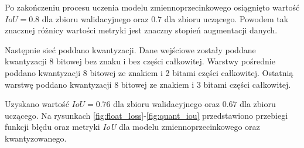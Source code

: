 Po zakończeniu procesu uczenia modelu zmiennoprzecinkowego osiągnięto wartość $IoU = 0.8$ dla zbioru walidacyjnego oraz $0.7$ dla zbioru uczącego. 
Powodem tak znacznej różnicy wartości metryki jest znaczny stopień augmentacji danych.

Następnie sieć poddano kwantyzacji. 
Dane wejściowe zostały poddane kwantyzacji 8 bitowej bez znaku i bez części całkowitej.
Warstwy pośrednie poddano kwantyzacji 8 bitowej ze znakiem i 2 bitami części całkowitej.
Ostatnią warstwę poddano kwantyzacji 8 bitowej ze znakiem i 3 bitami części całkowitej.

Uzyskano wartość $IoU = 0.76$ dla zbioru walidacyjnego oraz $0.67$ dla zbioru uczącego.
Na rysunkach \ref{fig:float_loss}-\ref{fig:quant_iou} przedstawiono przebiegi funkcji błędu oraz metryki \emph{IoU} dla modelu zmiennoprzecinkowego oraz kwantyzowanego.

